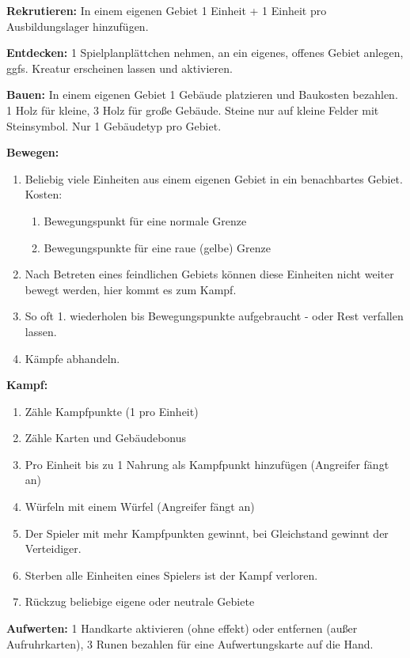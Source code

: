 \documentclass[fontsize=6pt]{scrreprt}
\begin{document}
  \textbf{Rekrutieren:}
  In einem eigenen Gebiet 1 Einheit + 1 Einheit pro Ausbildungslager hinzufügen.

  \textbf{Entdecken:}
  1 Spielplanplättchen nehmen, an ein eigenes, offenes Gebiet anlegen,
  ggfs. Kreatur erscheinen lassen und aktivieren.

  \textbf{Bauen:}
  In einem eigenen Gebiet 1 Gebäude platzieren und Baukosten bezahlen.
  1 Holz für kleine, 3 Holz für große Gebäude.
  Steine nur auf kleine Felder mit Steinsymbol.
  Nur 1 Gebäudetyp pro Gebiet.

  \textbf{Bewegen:}
  \begin{enumerate}[topsep=1pt, partopsep=0pt, parsep=0pt, itemsep=0pt, leftmargin=12pt]
    \item Beliebig viele Einheiten aus einem eigenen Gebiet in ein benachbartes Gebiet. Kosten:
    \begin{enumerate}[label=\textbf{\arabic*x}, topsep=0pt, partopsep=0pt, parsep=0pt, itemsep=0pt, leftmargin=10pt]
      \item Bewegungspunkt für eine normale Grenze
      \item Bewegungspunkte für eine raue (gelbe) Grenze
    \end{enumerate}
    \item Nach Betreten eines feindlichen Gebiets können diese Einheiten nicht weiter bewegt werden, hier kommt es zum Kampf.
    \item So oft 1. wiederholen bis Bewegungspunkte aufgebraucht - oder Rest verfallen lassen.
    \item Kämpfe abhandeln.
  \end{enumerate}

  \textbf{Kampf:}
  \begin{enumerate}[topsep=1pt, partopsep=0pt, parsep=0pt, itemsep=0pt, leftmargin=12pt]
    \item Zähle Kampfpunkte (1 pro Einheit)
    \item Zähle Karten und Gebäudebonus
    \item Pro Einheit bis zu 1 Nahrung als Kampfpunkt hinzufügen (Angreifer fängt an)
    \item Würfeln mit einem Würfel (Angreifer fängt an)
    \item Der Spieler mit mehr Kampfpunkten gewinnt, bei Gleichstand gewinnt der Verteidiger.
    \item Sterben alle Einheiten eines Spielers ist der Kampf verloren.
    \item Rückzug beliebige eigene oder neutrale Gebiete
  \end{enumerate}

  \textbf{Aufwerten:} 1 Handkarte aktivieren (ohne effekt) oder entfernen (außer Aufruhrkarten), 3 Runen bezahlen für eine Aufwertungskarte auf die Hand.
\end{document}
